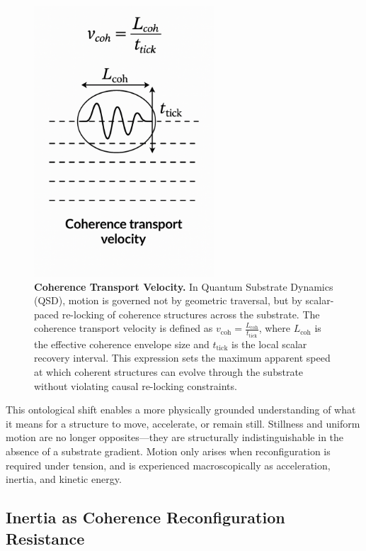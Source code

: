\documentclass[entropy,article,submit,pdftex,moreauthors]{Definitions/mdpi}
\begin{document}
\begin{figure}[H]
    \centering
    \includegraphics[width=0.6\textwidth]{figures/CTV.pdf}
    \caption{
    \textbf{Coherence Transport Velocity.} 
    In Quantum Substrate Dynamics (QSD), motion is governed not by geometric traversal, but by scalar-paced re-locking of coherence structures across the substrate. The coherence transport velocity is defined as \( v_{\text{coh}} = \frac{L_{\text{coh}}}{t_{\text{tick}}} \), where \( L_{\text{coh}} \) is the effective coherence envelope size and \( t_{\text{tick}} \) is the local scalar recovery interval. This expression sets the maximum apparent speed at which coherent structures can evolve through the substrate without violating causal re-locking constraints.
    }
    \label{fig:coherence-transport-velocity}
\end{figure}

This ontological shift enables a more physically grounded understanding of what it means for a structure to move, accelerate, or remain still. Stillness and uniform motion are no longer opposites—they are structurally indistinguishable in the absence of a substrate gradient. Motion only arises when reconfiguration is required under tension, and is experienced macroscopically as acceleration, inertia, and kinetic energy.


\subsection{Inertia as Coherence Reconfiguration Resistance}
\end{document}
